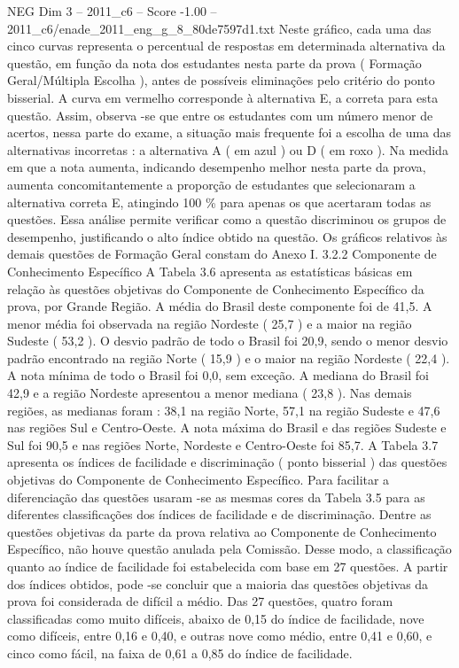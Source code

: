\begin{textsample}{NEG Dim 3 – 2011\_c6 – Score -1.00 – 2011\_c6/enade\_2011\_eng\_g\_8\_80de7597d1.txt}
Neste gráfico, cada uma das cinco curvas representa o percentual de respostas em determinada alternativa da questão, em função da nota dos estudantes nesta parte da prova ( Formação Geral/Múltipla Escolha ), antes de possíveis eliminações pelo critério do ponto bisserial.
A curva em vermelho corresponde à alternativa E, a correta para esta questão.
Assim, observa -se que entre os estudantes com um número menor de acertos, nessa parte do exame, a situação mais frequente foi a escolha de uma das alternativas incorretas : a alternativa A ( em azul ) ou D ( em roxo ).
Na medida em que a nota aumenta, indicando desempenho melhor nesta parte da prova, aumenta concomitantemente a proporção de estudantes que selecionaram a alternativa correta E, atingindo 100 \% para apenas os que acertaram todas as questões.
Essa análise permite verificar como a questão discriminou os grupos de desempenho, justificando o alto índice obtido na questão.
Os gráficos relativos às demais questões de Formação Geral constam do Anexo I. 3.2.2 Componente de Conhecimento Específico A Tabela 3.6 apresenta as estatísticas básicas em relação às questões objetivas do Componente de Conhecimento Específico da prova, por Grande Região.
A média do Brasil deste componente foi de 41,5.
A menor média foi observada na região Nordeste ( 25,7 ) e a maior na região Sudeste ( 53,2 ).
O desvio padrão de todo o Brasil foi 20,9, sendo o menor desvio padrão encontrado na região Norte ( 15,9 ) e o maior na região Nordeste ( 22,4 ).
A nota mínima de todo o Brasil foi 0,0, sem exceção.
A mediana do Brasil foi 42,9 e a região Nordeste apresentou a menor mediana ( 23,8 ).
Nas demais regiões, as medianas foram : 38,1 na região Norte, 57,1 na região Sudeste e 47,6 nas regiões Sul e Centro-Oeste.
A nota máxima do Brasil e das regiões Sudeste e Sul foi 90,5 e nas regiões Norte, Nordeste e Centro-Oeste foi 85,7.
A Tabela 3.7 apresenta os índices de facilidade e discriminação ( ponto bisserial ) das questões objetivas do Componente de Conhecimento Específico.
Para facilitar a diferenciação das questões usaram -se as mesmas cores da Tabela 3.5 para as diferentes classificações dos índices de facilidade e de discriminação.
Dentre as questões objetivas da parte da prova relativa ao Componente de Conhecimento Específico, não houve questão anulada pela Comissão.
Desse modo, a classificação quanto ao índice de facilidade foi estabelecida com base em 27 questões.
A partir dos índices obtidos, pode -se concluir que a maioria das questões objetivas da prova foi considerada de difícil a médio.
Das 27 questões, quatro foram classificadas como muito difíceis, abaixo de 0,15 do índice de facilidade, nove como difíceis, entre 0,16 e 0,40, e outras nove como médio, entre 0,41 e 0,60, e cinco como fácil, na faixa de 0,61 a 0,85 do índice de facilidade.

\end{textsample}
